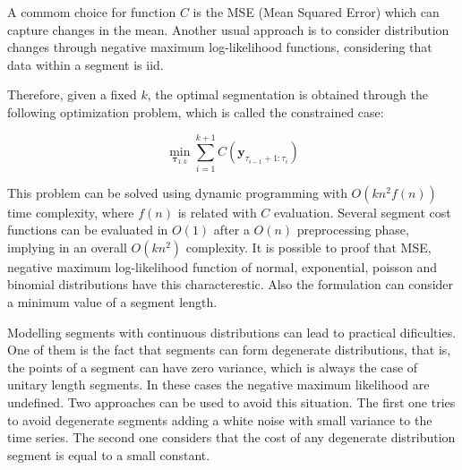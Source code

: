 A commom choice for function $C$ is the MSE (Mean Squared Error) which can capture changes in the mean. Another usual approach is to consider distribution changes through negative maximum log-likelihood functions, considering that data within a segment is iid. 

Therefore, given a fixed $k$, the optimal segmentation is obtained through the following optimization problem, which is called the constrained case: 

\begin{equation}
    \min_{\boldsymbol \tau_{1 : k}} \sum \limits_{i = 1}^{k + 1} C(\mathbf{y}_{\tau_{i - 1} + 1 : \tau_{i}})
\end{equation}

This problem can be solved using dynamic programming with $O(k n^2 f(n))$ time complexity, where $f(n)$ is related with $C$ evaluation. Several segment cost functions can be evaluated in $O(1)$ after a $O(n)$ preprocessing phase, implying in an overall $O(k n^2)$ complexity. It is possible to proof that MSE, negative maximum log-likelihood function of normal, exponential, poisson and binomial distributions have this characterestic. Also the formulation can consider a minimum value of a segment length.

Modelling segments with continuous distributions can lead to practical dificulties. One of them is the fact that segments can form degenerate distributions, that is, the points of a segment can have zero variance, which is always the case of unitary length segments. In these cases the negative maximum likelihood are undefined. Two approaches can be used to avoid this situation. The first one tries to avoid degenerate segments adding a white noise with small variance to the time series. The second one considers that the cost of any degenerate distribution segment is equal to a small constant.



